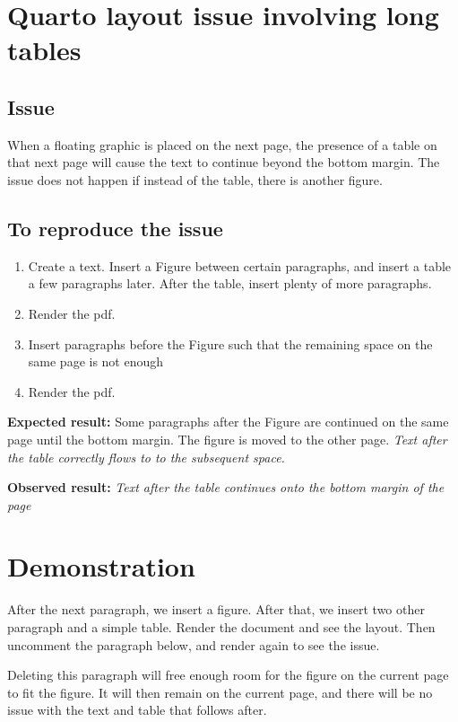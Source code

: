 \documentclass{article}
\begin{document}
\section{Quarto layout issue involving long tables}

\subsection{Issue}\label{issue}

When a floating graphic is placed on the next page, the presence of a
table on that next page will cause the text to continue beyond the
bottom margin. The issue does not happen if instead of the table, there
is another figure.

\subsection{To reproduce the issue}\label{reproissue}

\begin{enumerate}
\item
  Create a text. Insert a Figure between certain paragraphs, and insert
  a table a few paragraphs later. After the table, insert plenty of more
  paragraphs.
\item
  Render the pdf.
\item
  Insert paragraphs before the Figure such that the remaining space on
  the same page is not enough
\item
  Render the pdf.
\end{enumerate}

\textbf{Expected result:} Some paragraphs after the Figure are continued
on the same page until the bottom margin. The figure is moved to the
other page. \emph{Text after the table correctly flows to to the
subsequent space.}

\textbf{Observed result:} \emph{Text after the table continues onto the
bottom margin of the page}

\section{Demonstration}\label{demonstration}

After the next paragraph, we insert a figure. After that, we insert
two other paragraph and a simple table. Render the document and see the
layout. Then uncomment the paragraph below, and render again to see the
issue.

Deleting this paragraph will free enough room for the figure on the
current page to fit the figure. It will then remain on the current page,
and there will be no issue with the text and table that follows after.
\end{document}
